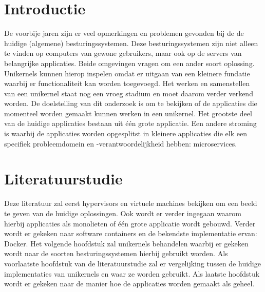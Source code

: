 \documentclass[fleqn,10pt]{voorstel}
\affiliation{\textbf{Contact:}
  \textsuperscript{1} \href{mailto:michiel.dewilde.u9305@student.hogent.be}{michiel.dewilde.u9305@student.hogent.be}}
\begin{document}
\flushbottom %
\maketitle %
\tableofcontents %
\thispagestyle{empty} %



\section{Introductie} %
\label{sec:introductie}

De voorbije jaren zijn er veel opmerkingen en problemen gevonden bij de de huidige (algemene) besturingssystemen. Deze besturingssystemen zijn niet alleen te vinden op computers van gewone gebruikers, maar ook op de servers van belangrijke applicaties. Beide omgevingen vragen om een ander soort oplossing. Unikernels kunnen hierop inspelen omdat er uitgaan van een kleinere fundatie waarbij er functionaliteit kan worden toegevoegd. Het werken en samenstellen van een unikernel staat nog een vroeg stadium en moet daarom verder verkend worden. De doelstelling van dit onderzoek is om te bekijken of de applicaties die momenteel worden gemaakt kunnen werken in een unikernel. Het grootste deel van de huidige applicaties bestaan uit één grote applicatie. Een andere stroming is waarbij de applicaties worden opgesplitst in kleinere applicaties die elk een specifiek probleemdomein en -verantwoordelijkheid hebben: microservices.



\section{Literatuurstudie}
\label{sec:Literatuurstudie}

Deze literatuur zal eerst hypervisors en virtuele machines bekijken om een beeld te geven van de huidige oplossingen. Ook wordt er verder ingegaan waarom hierbij applicaties als monolieten of één grote applicatie wordt gebouwd. Verder wordt er gekeken naar software containers en de bekendste implementatie ervan: Docker. Het volgende hoofdstuk zal unikernels behandelen waarbij er gekeken wordt naar de soorten besturingssystemen hierbij gebruikt worden.
Als voorlaatste hoofdstuk van de literatuurstudie zal er vergelijking tussen de huidige implementaties van unikernels en waar ze worden gebruikt. Als laatste hoofdstuk wordt er gekeken naar de manier hoe de applicaties worden gemaakt als geheel.
\end{document}
